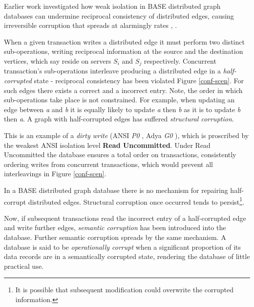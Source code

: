\documentclass[sigplan,10pt]{acmart}
\begin{document}
Earlier work investigated how weak isolation in BASE distributed graph databases can undermine reciprocal consistency of distributed edges, causing irreversible corruption that spreads at alarmingly rates \cite{Ezhilchelvan2018}, \cite{Webber2019}.

When a given transaction writes a distributed edge it must perform two distinct sub-operations, writing reciprocal information at the source and the destination vertices, which say reside on servers $S_i$ and $S_j$ respectively. Concurrent transaction's sub-operations interleave producing a distributed edge in a \emph{half-corrupted} state - reciprocal consistency has been violated Figure \ref{conf-scen}. For such edges there exists a correct and a incorrect entry. Note, the order in which sub-operations take place is not constrained. For example, when updating an edge between \emph{a} and \emph{b} it is equally likely to update \emph{a} then \emph{b} as it is to update \emph{b} then \emph{a}. A graph with half-corrupted edges has suffered \emph{structural corruption}.

This is an example of a \emph{dirty write} (ANSI \emph{P0} \cite{Berenson1995}, Adya \emph{G0} \cite{Adya2000}), which is proscribed by the weakest ANSI isolation level \textbf{Read Uncommitted}. Under Read Uncommitted the database ensures a total order on transactions, consistently ordering writes from concurrent transactions, which would prevent all interleavings in Figure \ref{conf-scen}.

In a BASE distributed graph database there is no mechanism for repairing half-corrupt distributed edges. Structural corruption once occurred tends to persist\footnote{It is possible that subsequent modification could overwrite the corrupted information.}.

Now, if subsequent transactions read the incorrect entry of a half-corrupted edge and write further edges, \emph{semantic corruption} has been introduced into the database. Further semantic corruption spreads by the same mechanism. A database is said to be \emph{operationally corrupt} when a significant proportion of its data records are in a semantically corrupted state, rendering the database of little practical use.
\end{document}
